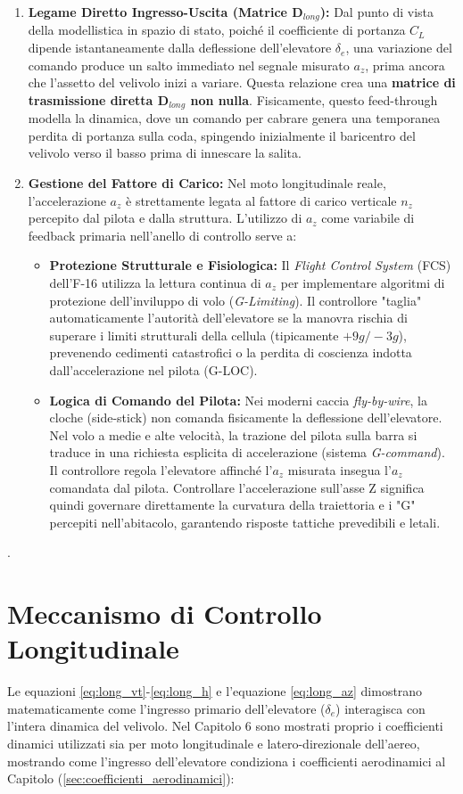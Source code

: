 \begin{enumerate}
	\item \textbf{Legame Diretto Ingresso-Uscita (Matrice $\mathbf{D}_{long}$):} 
	Dal punto di vista della modellistica in spazio di stato, poiché il coefficiente di portanza $C_L$ dipende istantaneamente dalla deflessione dell'elevatore $\delta_e$, una variazione del comando produce un salto immediato nel segnale misurato $a_z$, prima ancora che l'assetto del velivolo inizi a variare. Questa relazione crea una \textbf{matrice di trasmissione diretta $\mathbf{D}_{long}$ non nulla}. Fisicamente, questo feed-through modella la dinamica, dove un comando per cabrare genera una temporanea perdita di portanza sulla coda, spingendo inizialmente il baricentro del velivolo verso il basso prima di innescare la salita.
	
	\item \textbf{Gestione del Fattore di Carico:}
	Nel moto longitudinale reale, l'accelerazione $a_z$ è strettamente legata al fattore di carico verticale $n_z$ percepito dal pilota e dalla struttura. L'utilizzo di $a_z$ come variabile di feedback primaria nell'anello di controllo serve a:
	\begin{itemize}
		\item \textbf{Protezione Strutturale e Fisiologica:} Il \textit{Flight Control System} (FCS) dell'F-16 utilizza la lettura continua di $a_z$ per implementare algoritmi di protezione dell'inviluppo di volo (\textit{G-Limiting}). Il controllore "taglia" automaticamente l'autorità dell'elevatore se la manovra rischia di superare i limiti strutturali della cellula (tipicamente $+9g / -3g$), prevenendo cedimenti catastrofici o la perdita di coscienza indotta dall'accelerazione nel pilota (G-LOC).
		\item \textbf{Logica di Comando del Pilota:} Nei moderni caccia \textit{fly-by-wire}, la cloche (side-stick) non comanda fisicamente la deflessione dell'elevatore. Nel volo a medie e alte velocità, la trazione del pilota sulla barra si traduce in una richiesta esplicita di accelerazione (sistema \textit{G-command}). Il controllore regola l'elevatore affinché l'$a_z$ misurata insegua l'$a_z$ comandata dal pilota. Controllare l'accelerazione sull'asse Z significa quindi governare direttamente la curvatura della traiettoria e i "G" percepiti nell'abitacolo, garantendo risposte tattiche prevedibili e letali.
	\end{itemize}
\end{enumerate}.
\section{Meccanismo di Controllo Longitudinale}
Le equazioni \ref{eq:long_vt}-\ref{eq:long_h} e l'equazione \ref{eq:long_az} dimostrano matematicamente come l'ingresso primario dell'elevatore ($\delta_e$) interagisca con l'intera dinamica del velivolo. Nel Capitolo 6 sono mostrati proprio i coefficienti dinamici utilizzati sia per moto longitudinale e latero-direzionale dell'aereo, mostrando come l'ingresso dell'elevatore condiziona i coefficienti aerodinamici al Capitolo (\ref{sec:coefficienti_aerodinamici}):

